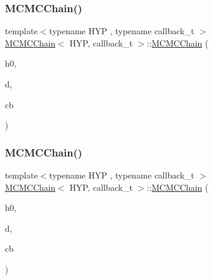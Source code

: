 \subsubsection{\texorpdfstring{M\+C\+M\+C\+Chain()}{MCMCChain()}\hspace{0.1cm}{\footnotesize\ttfamily [1/6]}}
{\footnotesize\ttfamily template$<$typename H\+YP , typename callback\+\_\+t $>$ \\
\hyperlink{class_m_c_m_c_chain}{M\+C\+M\+C\+Chain}$<$ H\+YP, callback\+\_\+t $>$\+::\hyperlink{class_m_c_m_c_chain}{M\+C\+M\+C\+Chain} (\begin{DoxyParamCaption}\item[{H\+YP \&}]{h0,  }\item[{typename H\+Y\+P\+::data\+\_\+t $\ast$}]{d,  }\item[{callback\+\_\+t \&}]{cb }\end{DoxyParamCaption})\hspace{0.3cm}{\ttfamily [inline]}}

\mbox{\label{class_m_c_m_c_chain_a731f2ca6416f1daa84cd54cd3f9281b2}} 
\subsubsection{\texorpdfstring{M\+C\+M\+C\+Chain()}{MCMCChain()}\hspace{0.1cm}{\footnotesize\ttfamily [2/6]}}
{\footnotesize\ttfamily template$<$typename H\+YP , typename callback\+\_\+t $>$ \\
\hyperlink{class_m_c_m_c_chain}{M\+C\+M\+C\+Chain}$<$ H\+YP, callback\+\_\+t $>$\+::\hyperlink{class_m_c_m_c_chain}{M\+C\+M\+C\+Chain} (\begin{DoxyParamCaption}\item[{H\+YP \&\&}]{h0,  }\item[{typename H\+Y\+P\+::data\+\_\+t $\ast$}]{d,  }\item[{callback\+\_\+t \&}]{cb }\end{DoxyParamCaption})\hspace{0.3cm}{\ttfamily [inline]}}

\mbox{\label{class_m_c_m_c_chain_afaa9a75b515252a8c6237aad0211a2f2}} 
